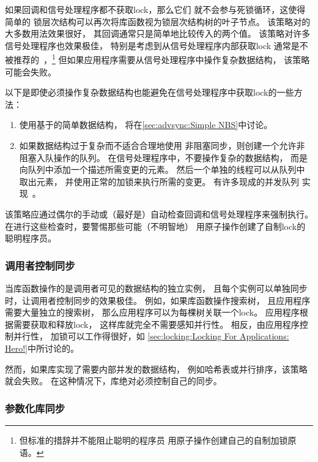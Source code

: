 如果回调和信号处理程序都不获取lock，那么它们
就不会参与死锁循环，这使得简单的
锁层次结构可以再次将库函数视为锁层次结构树的叶子节点。
该策略对的大多数用法效果很好，
其回调通常只是简单地比较传入的两个值。
该策略对许多信号处理程序也效果极佳，
特别是考虑到从信号处理程序内部获取lock
通常是不被推荐的~\cite{TheOpenGroup1997SUS}，\footnote{
	但标准的措辞并不能阻止聪明的程序员
	用原子操作创建自己的自制加锁原语。}
但如果应用程序需要从信号处理程序中操作复杂数据结构，
该策略可能会失败。

以下是即使必须操作复杂数据结构也能避免在信号处理程序中获取lock的一些方法：

\begin{enumerate}
\item	使用基于的简单数据结构，
	将在\cref{sec:advsync:Simple NBS}中讨论。
\item	如果数据结构过于复杂而不适合合理地使用
	非阻塞同步，则创建一个允许非阻塞入队操作的队列。
	在信号处理程序中，不要操作复杂的数据结构，
	而是向队列中添加一个描述所需变更的元素。
	然后一个单独的线程可以从队列中取出元素，
	并使用正常的加锁来执行所需的变更。
	有许多现成的并发队列
	实现~\cite{ChristophMKirsch2012FIFOisntTR,MathieuDesnoyers2009URCU,MichaelScott96}。
\end{enumerate}

该策略应通过偶尔的手动或（最好是）自动检查回调和信号处理程序来强制执行。
在进行这些检查时，要警惕那些可能（不明智地）
用原子操作创建了自制lock的聪明程序员。

\subsubsection{调用者控制同步}
\label{sec:locking:Caller Controls Synchronization}

当库函数操作的是调用者可见的数据结构的独立实例，
且每个实例可以单独同步时，让调用者控制同步的效果极佳。
例如，如果库函数操作搜索树，
且应用程序需要大量独立的搜索树，
那么应用程序可以为每棵树关联一个lock。
应用程序根据需要获取和释放lock，
这样库就完全不需要感知并行性。
相反，由应用程序控制并行性，
加锁可以工作得很好，如
\cref{sec:locking:Locking For Applications: Hero!}中所讨论的。

然而，如果库实现了需要内部并发的数据结构，
例如哈希表或并行排序，该策略就会失败。
在这种情况下，库绝对必须控制自己的同步。

\subsubsection{参数化库同步}
\label{sec:locking:Parameterize Library Synchronization}

